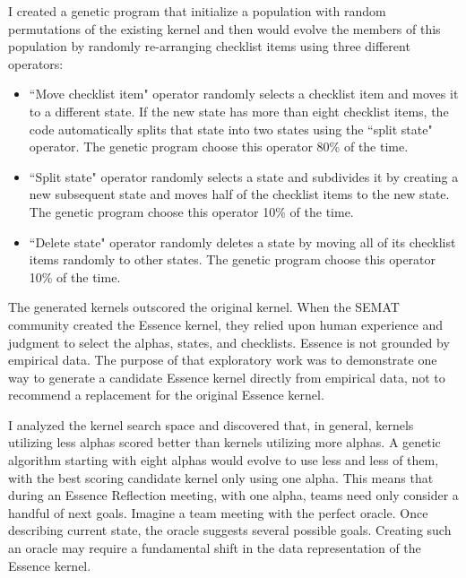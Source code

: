 \documentclass[preprint,12pt,3p]{elsarticle}
\begin{document}
I created a genetic program that initialize a population with random permutations of the existing kernel and then would evolve the members of this population by randomly re-arranging checklist items using three different operators:

\begin{itemize}
\item ``Move checklist item" operator randomly selects a checklist item and moves it to a different state. If the new state has more than eight checklist items, the code automatically splits that state into two states using the ``split state" operator. The genetic program choose this operator 80\% of the time.
\item ``Split state" operator randomly selects a state and subdivides it by creating a new subsequent state and moves half of the checklist items to the new state. The genetic program choose this operator 10\% of the time.
\item ``Delete state" operator randomly deletes a state by moving all of its checklist items randomly to other states. The genetic program choose this operator 10\% of the time.
\end{itemize}

The generated kernels outscored the original kernel. When the SEMAT community created the Essence kernel, they relied upon human experience and judgment to select the alphas, states, and checklists. Essence is not grounded by empirical data. The purpose of that exploratory work was to demonstrate one way to generate a candidate Essence kernel directly from empirical data, not to recommend a replacement for the original Essence kernel. 

I analyzed the kernel search space and discovered that, in general, kernels utilizing less alphas scored better than kernels utilizing more alphas. A genetic algorithm starting with eight alphas would evolve to use less and less of them, with the best scoring candidate kernel only using one alpha. This means that during an Essence Reflection meeting, with one alpha, teams need only consider a handful of next goals. Imagine a team meeting with the perfect oracle. Once describing current state, the oracle suggests several possible goals. Creating such an oracle may require a fundamental shift in the data representation of the Essence kernel. 

\end{document}

